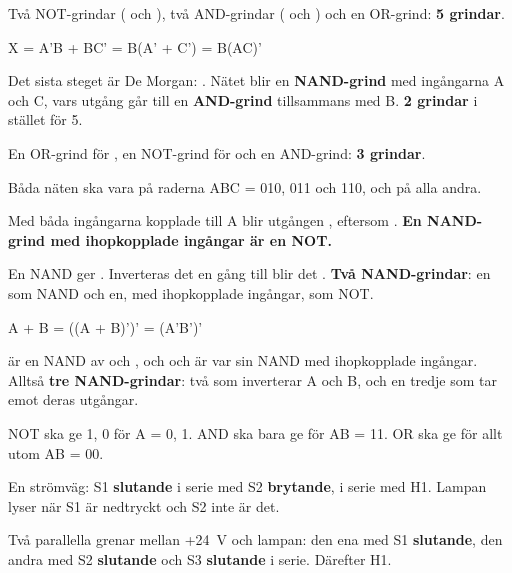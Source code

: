 Två NOT-grindar ( och ), två AND-grindar ( och ) och en
OR-grind: \textbf{5 grindar}.

\leavevmode

\begin{console}
X = A'B + BC' = B(A' + C') = B(AC)'
\end{console}

\noindent Det sista steget är De Morgan: \mbox{}. Nätet blir en
\textbf{NAND-grind} med ingångarna A och C, vars utgång går till en \textbf{AND-grind} tillsammans
med B. \textbf{2 grindar} i stället för 5.

En OR-grind för \mbox{}, en NOT-grind för  och en AND-grind: \textbf{3
grindar}.

Båda näten ska vara  på raderna ABC = 010, 011 och 110, och  på alla andra.

Med båda ingångarna kopplade till A blir utgången \mbox{}, eftersom
\mbox{}. \textbf{En NAND-grind med ihopkopplade ingångar är en NOT.}

En NAND ger . Inverteras det en gång till blir det . \textbf{Två
NAND-grindar}: en som NAND och en, med ihopkopplade ingångar, som NOT.

\leavevmode

\begin{console}
A + B = ((A + B)')' = (A'B')'
\end{console}

\noindent{} är en NAND av  och , och  och  är var
sin NAND med ihopkopplade ingångar. Alltså \textbf{tre NAND-grindar}: två som inverterar A och B,
och en tredje som tar emot deras utgångar.

NOT ska ge 1, 0 för A = 0, 1. AND ska bara ge  för AB = 11. OR ska ge  för
allt utom AB = 00.

En strömväg: S1 \textbf{slutande} i serie med S2 \textbf{brytande}, i serie med H1. Lampan
lyser när S1 är nedtryckt och S2 inte är det.

Två parallella grenar mellan +24~V och lampan: den ena med S1 \textbf{slutande}, den andra
med S2 \textbf{slutande} och S3 \textbf{slutande} i serie. Därefter H1.

